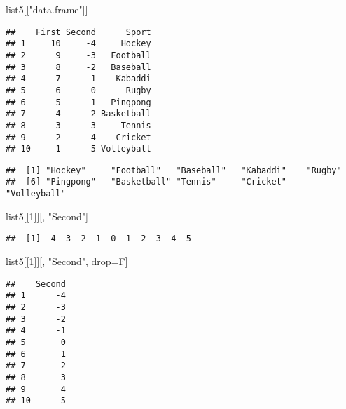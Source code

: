 \documentclass[
]{article}
\newenvironment{Shaded}{\begin{snugshade}}{\end{snugshade}}
\newcommand{\CommentTok}[1]{\textcolor[rgb]{0.56,0.35,0.01}{\textit{#1}}}
\newcommand{\DecValTok}[1]{\textcolor[rgb]{0.00,0.00,0.81}{#1}}
\newcommand{\NormalTok}[1]{#1}
\newcommand{\OtherTok}[1]{\textcolor[rgb]{0.56,0.35,0.01}{#1}}
\newcommand{\SpecialCharTok}[1]{\textcolor[rgb]{0.81,0.36,0.00}{\textbf{#1}}}
\newcommand{\StringTok}[1]{\textcolor[rgb]{0.31,0.60,0.02}{#1}}
\begin{document}
\begin{Shaded}
\begin{Highlighting}[]
\NormalTok{list5[[}\StringTok{"data.frame"}\NormalTok{]]}
\end{Highlighting}
\end{Shaded}

\begin{verbatim}
##    First Second      Sport
## 1     10     -4     Hockey
## 2      9     -3   Football
## 3      8     -2   Baseball
## 4      7     -1    Kabaddi
## 5      6      0      Rugby
## 6      5      1   Pingpong
## 7      4      2 Basketball
## 8      3      3     Tennis
## 9      2      4    Cricket
## 10     1      5 Volleyball
\end{verbatim}

\begin{Shaded}
\end{Shaded}

\begin{verbatim}
##  [1] "Hockey"     "Football"   "Baseball"   "Kabaddi"    "Rugby"     
##  [6] "Pingpong"   "Basketball" "Tennis"     "Cricket"    "Volleyball"
\end{verbatim}

\begin{Shaded}
\begin{Highlighting}[]
\NormalTok{list5[[}\DecValTok{1}\NormalTok{]][, }\StringTok{"Second"}\NormalTok{]}
\end{Highlighting}
\end{Shaded}

\begin{verbatim}
##  [1] -4 -3 -2 -1  0  1  2  3  4  5
\end{verbatim}

\begin{Shaded}
\begin{Highlighting}[]
\NormalTok{list5[[}\DecValTok{1}\NormalTok{]][, }\StringTok{"Second"}\NormalTok{, drop}\OtherTok{=}\NormalTok{F]}
\end{Highlighting}
\end{Shaded}

\begin{verbatim}
##    Second
## 1      -4
## 2      -3
## 3      -2
## 4      -1
## 5       0
## 6       1
## 7       2
## 8       3
## 9       4
## 10      5
\end{verbatim}
\end{document}

